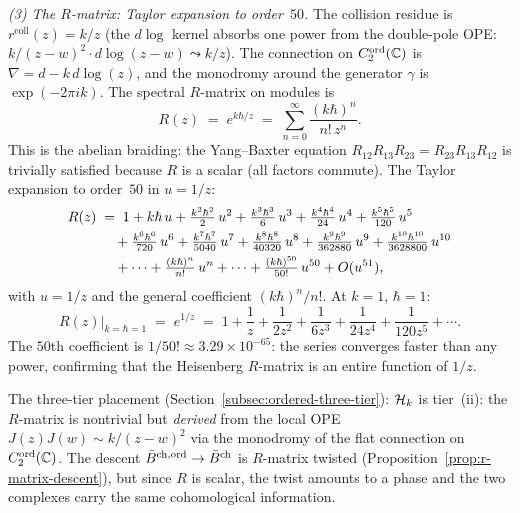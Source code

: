 \begin{computation}
\smallskip
\noindent
\emph{(3) The $R$-matrix: Taylor expansion to order~$50$.}
The collision residue is $r^{\mathrm{coll}}(z) = k/z$ (the
$d\log$ kernel absorbs one power from the double-pole OPE:
$k/(z-w)^2 \cdot d\log(z-w) \leadsto k/z$). The
connection on $C_2^{\mathrm{ord}}(\mathbb{C})$ is
$\nabla = d - k\, d\log(z)$, and the monodromy around
the generator $\gamma$ is $\exp(-2\pi i k)$. The spectral
$R$-matrix on modules is
\begin{equation}\label{eq:e1-shadow-R}
R(z) \;=\; e^{k\hbar/z}
\;=\;
\sum_{n=0}^{\infty} \frac{(k\hbar)^n}{n!\, z^n}.
\end{equation}
This is the abelian braiding: the Yang--Baxter equation
$R_{12}R_{13}R_{23} = R_{23}R_{13}R_{12}$ is trivially satisfied
because $R$ is a scalar (all factors commute). The Taylor
expansion to order~$50$ in $u = 1/z$:
\begin{align}\label{eq:e1-R-expansion-50}
R(z) \;&=\;
1 + k\hbar\, u + \tfrac{k^2\hbar^2}{2}\, u^2
+ \tfrac{k^3\hbar^3}{6}\, u^3
+ \tfrac{k^4\hbar^4}{24}\, u^4
+ \tfrac{k^5\hbar^5}{120}\, u^5
\notag\\
&\quad
+ \tfrac{k^6\hbar^6}{720}\, u^6
+ \tfrac{k^7\hbar^7}{5040}\, u^7
+ \tfrac{k^8\hbar^8}{40320}\, u^8
+ \tfrac{k^9\hbar^9}{362880}\, u^9
+ \tfrac{k^{10}\hbar^{10}}{3628800}\, u^{10}
\notag\\
&\quad + \cdots
+ \tfrac{(k\hbar)^n}{n!}\, u^n + \cdots
+ \tfrac{(k\hbar)^{50}}{50!}\, u^{50}
+ O(u^{51}),
\end{align}
with $u = 1/z$ and the general coefficient
$(k\hbar)^n/n!$. At $k = 1$, $\hbar = 1$:
\[
R(z)\big|_{k=\hbar=1}
\;=\;
e^{1/z}
\;=\;
1 + \frac{1}{z} + \frac{1}{2z^2}
+ \frac{1}{6z^3} + \frac{1}{24z^4}
+ \frac{1}{120z^5} + \cdots.
\]
The $50$th coefficient is $1/50! \approx 3.29 \times 10^{-65}$:
the series converges faster than any power, confirming that
the Heisenberg $R$-matrix is an entire function of $1/z$.

The three-tier placement
(Section~\ref{subsec:ordered-three-tier}): $\mathcal{H}_k$ is
tier~(ii): the $R$-matrix is nontrivial but \emph{derived}
from the local OPE $J(z)J(w) \sim k/(z-w)^2$ via the
monodromy of the flat connection on $C_2^{\mathrm{ord}}(\mathbb{C})$.
The descent $\bar{B}^{\mathrm{ch,ord}} \to \bar{B}^{\mathrm{ch}}$ is
$R$-matrix twisted
(Proposition~\ref{prop:r-matrix-descent}), but since
$R$ is scalar, the twist amounts to a phase and the two
complexes carry the same cohomological information.


\end{computation}

